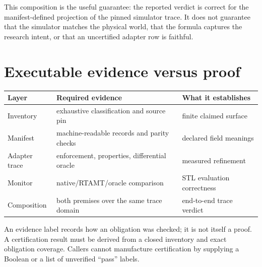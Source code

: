 \documentclass[11pt]{article}
\begin{document}
This composition is the useful guarantee: the reported verdict is correct for
the manifest-defined projection of the pinned simulator trace.  It does not
guarantee that the simulator matches the physical world, that the formula
captures the research intent, or that an uncertified adapter row is faithful.

\section{Executable evidence versus proof}

\begin{center}
\begin{tabular}{@{}lll@{}}
\toprule
Layer & Required evidence & What it establishes \\
\midrule
Inventory & exhaustive classification and source pin & finite claimed surface \\
Manifest & machine-readable records and parity checks & declared field meanings \\
Adapter trace & enforcement, properties, differential oracle & measured refinement \\
Monitor & native/RTAMT/oracle comparison & STL evaluation correctness \\
Composition & both premises over the same trace domain & end-to-end trace verdict \\
\bottomrule
\end{tabular}
\end{center}

An evidence label records how an obligation was checked; it is not itself a
proof.  A certification result must be derived from a closed inventory and
exact obligation coverage.  Callers cannot manufacture certification by
supplying a Boolean or a list of unverified ``pass'' labels.
\end{document}
